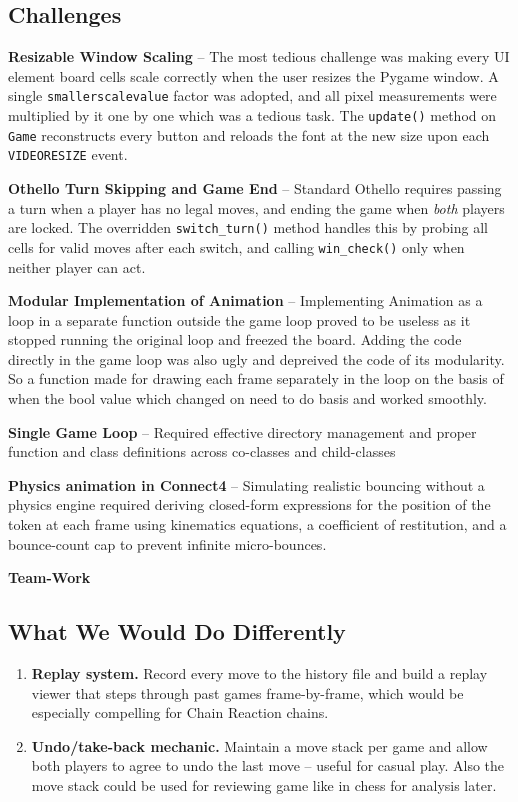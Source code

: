 \documentclass[12pt]{article}
\begin{document}
\subsection{Challenges}

\textbf{Resizable Window Scaling} -- The most tedious challenge was making every UI element board cells scale correctly when the user resizes the Pygame window. A single \texttt{smallerscalevalue} factor was adopted, and all pixel measurements were multiplied by it one by one which was a tedious task. The \texttt{update()} method on \texttt{Game} reconstructs every button and reloads the font at the new size upon each \texttt{VIDEORESIZE} event.


\textbf{Othello Turn Skipping and Game End} -- Standard Othello requires passing a turn when a player has no legal moves, and ending the game when \emph{both} players are locked. The overridden \texttt{switch\_turn()} method handles this by probing all cells for valid moves after each switch, and calling \texttt{win\_check()} only when neither player can act.

\textbf{Modular Implementation of Animation} -- Implementing Animation as a loop in a separate function outside the game loop proved to be useless as it stopped running the original loop and freezed the board. Adding the code directly in the game loop was also ugly and depreived the code of its modularity. So a function made for drawing each frame separately in the loop on the basis of when the bool value which changed on need to do basis and worked smoothly.

\textbf{Single Game Loop} -- Required effective directory management and proper function and class definitions across co-classes and child-classes

\textbf{Physics animation in Connect4} -- Simulating realistic bouncing without a physics engine required deriving closed-form expressions for the position of the token at each frame using kinematics equations, a coefficient of restitution, and a bounce-count cap to prevent infinite micro-bounces.

\textbf{Team-Work}

\subsection{What We Would Do Differently}

\begin{enumerate}[leftmargin=*, label=\textbf{\arabic*.}]

\item \textbf{Replay system.} Record every move to the history file and build a replay viewer that steps through past games frame-by-frame, which would be especially compelling for Chain Reaction chains.

\item \textbf{Undo/take-back mechanic.} Maintain a move stack per game and allow both players to agree to undo the last move -- useful for casual play. Also the move stack could be used for reviewing game like in chess for analysis later.

\end{enumerate}
\newpage
\end{document}
